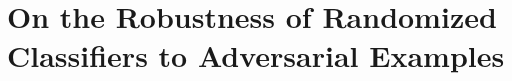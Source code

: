 













\newcommand{\perturb}{{\tau}}
\newcommand{\integer}{\mathbb{N}}
\newcommand{\inputdim}{d}
\newcommand{\numclasses}{K}
\newcommand{\hypothesis}{{h}}
\newcommand{\fullSample}{\mathcal{S}}
\newcommand{\equationspace}{\thinspace}
\newcommand{\CandidateClass}{\Bar{\mathcal{H}}}
\newcommand{\Qone}{\textbf{Q1}}
\newcommand{\Qtwo}{\textbf{Q2}}
\newcommand{\zerooneloss}{\loss_{0/1}}
\newcommand{\zo}{0/1}
\newcommand\numberthis{\addtocounter{equation}{1}\tag{\theequation}}
\newcommand{\hypothesisbinary}{h}
\newcommand{\comp}{~\mathsf{c}}
\renewcommand{\th}{\textsuperscript{\textup{th}}\xspace}





\newcommand{\etal}{\emph{et al.}}
\newcommand{\iid}{\emph{i.i.d.}}
\newcommand{\ltwo}{\ell_2}
\newcommand{\linf}{\ell_\infty}


\newcommand\yann[1]{{\color{red} #1}}
\chapter{On the Robustness of Randomized Classifiers to Adversarial Examples}
\label{paper:rando}

